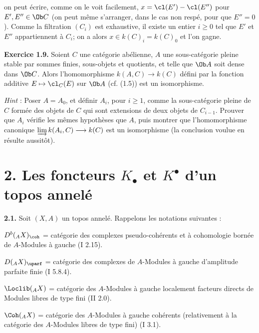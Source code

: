 on
peut écrire, comme on le voit facilement, \(x=\cl(E')-\cl(E'')\) pour \(E',E''\in\Ob C\) (on peut même s'arranger, dans le cas non respé, pour que \(E''=0\)). Comme la filtration \((C_i)\) est exhaustive, il existe un entier \(i\geq0\) tel que \(E'\) et \(E''\) appartiennent à \(C_i\); on a alors \(x\in k(C)_i=k(C)_0\) et l'on gagne.

\textbf{Exercice 1.9.} Soient \(C\) une catégorie abélienne, \(A\) une sous-catégorie pleine stable par sommes finies, sous-objets et quotients, et telle que \(\Ob A\) soit dense dans \(\Ob C\). Alors l'homomorphisme \(k(A,C)\longrightarrow k(C)\) défini par la fonction additive \(E\mapsto\cl_C(E)\) sur \(\Ob A\) (cf. (1.5)) est un isomorphisme.

\emph{Hint} : Poser \(A=A_0\), et définir \(A_i\), pour \(i\geq1\), comme la sous-catégorie pleine de \(C\) formée des objets de \(C\) qui sont extensions de deux objets de \(C_{i-1}\). Prouver que \(A_i\) vérifie les mêmes hypothèses que \(A\), puis montrer que l'homomorphisme canonique \(\varinjlim k(A_i,C)\longrightarrow k(C)\) est un isomorphisme (la conclusion voulue en résulte aussitôt).

\section*{2. Les foncteurs \(K_{\bullet}\) et \(K^{\bullet}\) d'un topos annelé}

\textbf{2.1.} Soit \((X,A)\) un topos annelé. Rappelons les notations suivantes :

\(D^b({}_A X)_{\coh}\) = catégorie des complexes pseudo-cohérents et à cohomologie bornée de \(A\)-Modules à gauche (I 2.15).

\(D({}_A X)_{\uparf}\) = catégorie des complexes de \(A\)-Modules à gauche d'amplitude parfaite finie (I 5.8.4).

\(\Loclib({}_A X)\) = catégorie des \(A\)-Modules à gauche localement facteurs directs de Modules libres de type fini (II 2.0).

\(\Coh({}_A X)\) = catégorie des \(A\)-Modules à gauche cohérents (relativement à la catégorie des \(A\)-Modules libres de type fini) (I 3.1).


